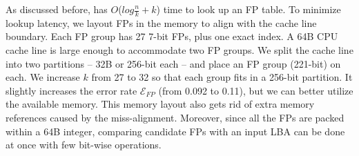 As discussed before, \ours{} has $O$($log\frac{n}{k}+k$) time to
look up an FP table.
To minimize lookup latency, we layout FPs in the memory to align with the
cache line boundary. Each FP group has 27 7-bit FPs, plus one exact index.
A 64B CPU cache line is large enough to accommodate two FP groups.
We split the cache line into two partitions -- 32B or 256-bit each -- and
place an FP group (221-bit) on each.  We increase $k$ from 27
to 32 so that each group fits in a 256-bit partition.  
It slightly increases the error rate $\mathcal{E}_{FP}$ (from 0.092 to 0.11), 
but we can better utilize the available memory.  
This memory layout also gets rid of extra memory references
caused by the miss-alignment.  
Moreover, since all the FPs are packed within a 64B integer,
comparing candidate FPs with an input LBA can be done at once
with few bit-wise operations.















